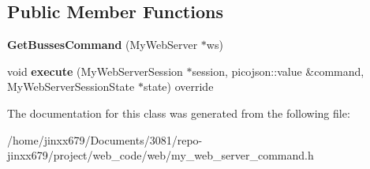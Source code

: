 \subsection*{Public Member Functions}
\begin{DoxyCompactItemize}
\item 
\mbox{\label{classGetBussesCommand_abdf0e1bf71a56269d9029c2a7d6287c7}} 
{\bfseries Get\+Busses\+Command} (My\+Web\+Server $\ast$ws)
\item 
\mbox{\label{classGetBussesCommand_a4219c959554ef55b2f76559ea681d56f}} 
void {\bfseries execute} (My\+Web\+Server\+Session $\ast$session, picojson\+::value \&command, My\+Web\+Server\+Session\+State $\ast$state) override
\end{DoxyCompactItemize}


The documentation for this class was generated from the following file\+:\begin{DoxyCompactItemize}
\item 
/home/jinxx679/\+Documents/3081/repo-\/jinxx679/project/web\+\_\+code/web/my\+\_\+web\+\_\+server\+\_\+command.\+h\end{DoxyCompactItemize}
